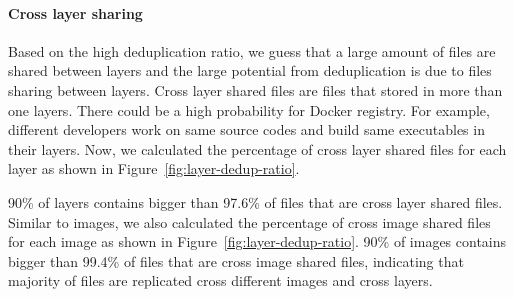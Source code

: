 
\paragraph{Cross layer sharing}

Based on the high deduplication ratio, we guess that a large amount of files are shared between layers and the large potential from deduplication is due to files sharing between layers. Cross layer shared files are files that stored in more than one layers. There could be a high probability for Docker registry. For example, different developers work on same source codes and build same executables in their layers. Now, we calculated the percentage of cross layer shared files for each layer as shown in Figure~\ref{fig:layer-dedup-ratio}. 
 

%
90\% of layers contains bigger than 97.6\% of files that are cross layer shared files. Similar to images, we also calculated the percentage of cross image shared files for each image as shown in Figure~\ref{fig:layer-dedup-ratio}. 90\% of images contains bigger than 99.4\% of files that are cross image shared files, indicating that majority of files are replicated cross different images and cross layers.

